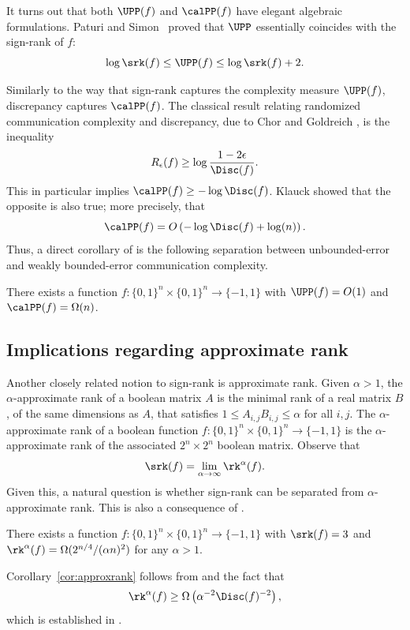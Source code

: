 It turns out that both $\UPP(f)$ and $\calPP(f)$  have elegant algebraic formulations. Paturi and Simon~\cite{paturi1986probabilistic} proved that $\UPP$ essentially coincides with the sign-rank of $f$:
$$\log \srk (f) \le \UPP(f) \le \log \srk (f)+2.$$

%
Similarly  %
to the way that sign-rank captures the complexity measure $\UPP(f)$, discrepancy captures $\calPP(f)$. The classical result relating randomized communication complexity and discrepancy, due to Chor and Goldreich  \cite{chor1988unbiased}, is the inequality
%
$$
R_{\epsilon}(f) \ge \log  \frac{1-2 \epsilon}{\Disc(f)}.
$$
This in particular implies $\calPP(f) \ge  -\log\Disc(f)$.
Klauck \cite{klauck2001lower}  showed that the opposite is also true; more precisely, that
$$\calPP(f)=O\left( - \log \Disc(f) + \log(n)\right). $$
Thus, a direct corollary of  is the following separation between unbounded-error and weakly bounded-error communication complexity.

\begin{corollary}\label{cor:separation}
There exists a  function $f:\{0,1\}^n \times \{0,1\}^n \to \{-1,1\}$ with $\UPP(f) = O(1)$ and $\calPP(f) = \Omega(n)$.
\end{corollary}



\subsection{Implications regarding approximate rank}
Another closely related notion to sign-rank is approximate rank. Given $\alpha > 1$, the $\alpha$-approximate rank of a boolean matrix $A$
is the minimal rank of a real matrix $B$, of the same dimensions as $A$, that satisfies $1 \le A_{i,j} B_{i,j} \le \alpha$ for all $i,j$.
The $\alpha$-approximate rank of a boolean function $f:\{0,1\}^n \times \{0,1\}^n \to \{-1,1\}$ is the $\alpha$-approximate rank of the associated $2^n \times 2^n$ boolean matrix. Observe that
$$\srk(f) = \lim_{\alpha\to\infty} \rk^\alpha(f).$$
Given this, a natural question is whether sign-rank can be separated from $\alpha$-approximate rank.
%
This is also a consequence of .
\begin{corollary}\label{cor:approxrank}
There exists a  function $f:\{0,1\}^n \times \{0,1\}^n \to \{-1,1\}$ with $\srk(f) = 3$ and $\rk^{\alpha}(f) = \Omega(2^{n/4} / (\alpha n)^2)$ for any $\alpha> 1$.
\end{corollary}
Corollary~\ref{cor:approxrank} follows from  and the fact that
$$\rk^{\alpha}(f) \geq \Omega\left(\alpha^{-2}\Disc(f)^{-2}\right),$$
which is established in %
\cite[Equation (1)]{gal-syed}.


